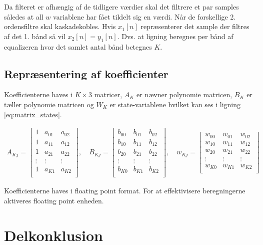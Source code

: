     Da filteret er afhængig af de tidligere værdier skal det filtrere et par samples således at all $w$ variablene 
    har fået tildelt sig en værdi.
Når de forskellige 2. ordensfiltre skal kaskadekobles. Hvis $x_{1}[n]$ repræsenterer det sample der filtres af det 1. bånd så vil $x_{2}[n] = y_{1}[n]$.
    Dvs. at ligning \label{eq:iir_diff_real} beregnes per bånd af equalizeren hvor det samlet antal bånd betegnes $K$.\\
\subsection{Repræsentering af koefficienter}

    Koefficienterne haves i $K \times 3$ matricer,
    $A_K$ er nævner polynomie matricen, $B_K$ er tæller polynomie matricen
   og $W_K$ er state-variablene hvilket kan ses i ligning \ref{eq:matrix_states}.  

   \begin{align}
   A_{Kj} = \left[\begin{matrix}
   1 			& a_{01} 	& a_{02} \\
   1 			& a_{11} 	& a_{12} \\
   1 			& a_{21} 	& a_{22} \\
   \vdots 		& \vdots 	&  \vdots \\
   1 			& a_{K1} 	& a_{K2} \\
   \end{matrix}
   \right], \quad
      B_{Kj} = \left[\begin{matrix}
   b_{00}		& b_{01} 	& b_{02} \\
   b_{10}		& b_{11} 	& b_{12} \\
   b_{20}		& b_{21} 	& b_{22} \\
   \vdots 		& \vdots 	&  \vdots \\
   b_{K0}		& b_{K1} 	& b_{K2} \\
   \end{matrix}
   \right], \quad
      w_{Kj} = \left[\begin{matrix}
   w_{00}		& w_{01} 	& w_{02} \\
   w_{10}		& w_{11} 	& w_{12} \\
   w_{20}		& w_{21} 	& w_{22} \\
   \vdots 		& \vdots 	&  \vdots \\
   w_{K0}		& w_{K1} 	& w_{K2} \\
   \end{matrix}
   \right]
   \label{eq:matrix_states}
   \end{align}

   Koefficienterne haves i floating point format. For at effektivisere beregningerne aktiveres floating point 
   enheden. 



\section{Delkonklusion}

